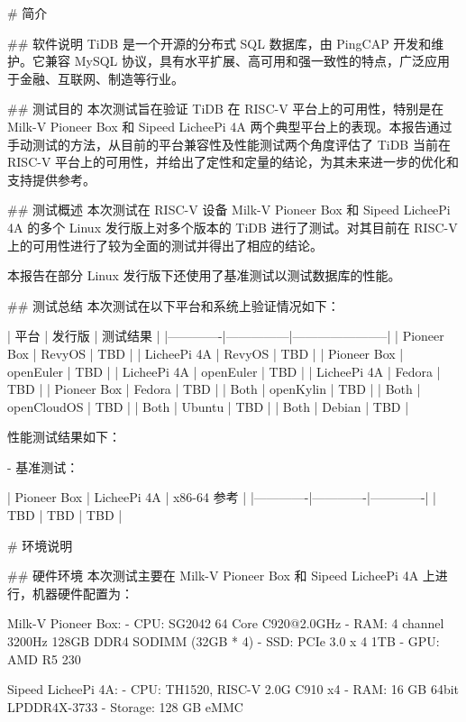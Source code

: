 \documentclass{article}
\begin{document}
\begin{markdown}

# 简介

## 软件说明
TiDB 是一个开源的分布式 SQL 数据库，由 PingCAP 开发和维护。它兼容 MySQL 协议，具有水平扩展、高可用和强一致性的特点，广泛应用于金融、互联网、制造等行业。

## 测试目的
本次测试旨在验证 TiDB 在 RISC-V 平台上的可用性，特别是在 Milk-V Pioneer Box 和 Sipeed LicheePi 4A 两个典型平台上的表现。本报告通过手动测试的方法，从目前的平台兼容性及性能测试两个角度评估了 TiDB 当前在 RISC-V 平台上的可用性，并给出了定性和定量的结论，为其未来进一步的优化和支持提供参考。

## 测试概述
本次测试在 RISC-V 设备 Milk-V Pioneer Box 和 Sipeed LicheePi 4A 的多个 Linux 发行版上对多个版本的 TiDB 进行了测试。对其目前在 RISC-V 上的可用性进行了较为全面的测试并得出了相应的结论。

本报告在部分 Linux 发行版下还使用了基准测试以测试数据库的性能。

## 测试总结
本次测试在以下平台和系统上验证情况如下：

| 平台        | 发行版        | 测试结果              |
|-------------|---------------|-----------------------|
| Pioneer Box | RevyOS        | TBD                   |
| LicheePi 4A | RevyOS        | TBD                   |
| Pioneer Box | openEuler     | TBD                   |
| LicheePi 4A | openEuler     | TBD                   |
| LicheePi 4A | Fedora        | TBD                   |
| Pioneer Box | Fedora        | TBD                   |
| Both        | openKylin     | TBD                   |
| Both        | openCloudOS   | TBD                   |
| Both        | Ubuntu        | TBD                   |
| Both        | Debian        | TBD                   |

性能测试结果如下：

- 基准测试：

| Pioneer Box | LicheePi 4A | x86-64 参考 |
|-------------|-------------|-------------|
|    TBD      | TBD         | TBD         |

# 环境说明

## 硬件环境
本次测试主要在 Milk-V Pioneer Box 和 Sipeed LicheePi 4A 上进行，机器硬件配置为：

Milk-V Pioneer Box:
- CPU: SG2042 64 Core C920@2.0GHz
- RAM: 4 channel 3200Hz 128GB DDR4 SODIMM (32GB * 4)
- SSD: PCIe 3.0 x 4 1TB
- GPU: AMD R5 230

Sipeed LicheePi 4A:
- CPU: TH1520, RISC-V 2.0G C910 x4
- RAM: 16 GB 64bit LPDDR4X-3733
- Storage: 128 GB eMMC


\end{markdown}
\end{document}

